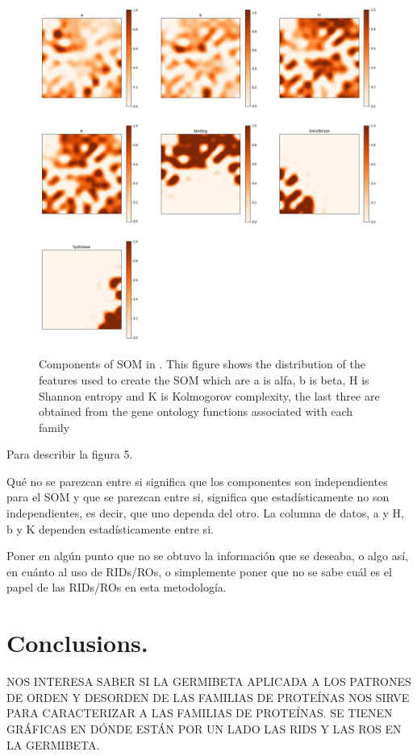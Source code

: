 \documentclass[preprint,12pt]{elsarticle}
\begin{document}
\begin{figure}[htb]
	\includegraphics[width=\linewidth]{images/05_SOM.jpg}
	\label{fig:som}
	\endminipage
	\caption{Components of SOM in \label{fig:som}. 
	This figure shows the distribution of the features used to create the SOM which are a is alfa, b is beta, H is Shannon entropy and K is Kolmogorov complexity, 
	the last three are obtained from the gene ontology functions associated with each family}

\end{figure}



Para describir la figura 5.

Qué no se parezcan entre si significa que los componentes son independientes para el SOM y que se parezcan entre si, significa que estadísticamente no son independientes, es decir, que uno dependa del otro. La columna de datos, a y H, b y K dependen estadísticamente entre si. 

\par Poner en algún punto que no se obtuvo la información que se deseaba, o algo así, en cuánto al uso de RIDs/ROs, o simplemente poner que no se sabe cuál es el papel de las RIDs/ROs en esta metodología. 

\clearpage


\section{\textbf{Conclusions.}}
\label{S:1}
NOS INTERESA SABER SI LA GERMIBETA APLICADA A LOS PATRONES DE ORDEN Y DESORDEN DE LAS FAMILIAS DE PROTEÍNAS NOS SIRVE PARA CARACTERIZAR A LAS FAMILIAS DE PROTEÍNAS. SE TIENEN GRÁFICAS EN DÓNDE ESTÁN POR UN LADO LAS RIDS Y LAS ROS EN LA GERMIBETA. 
\end{document}
